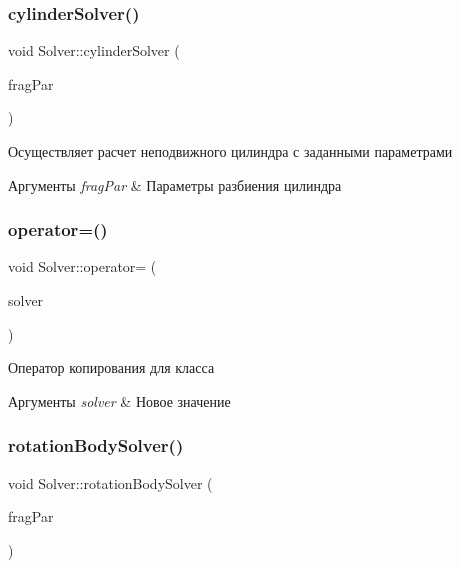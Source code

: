 \subsubsection{\texorpdfstring{cylinder\+Solver()}{cylinderSolver()}}
{\footnotesize\ttfamily void Solver\+::cylinder\+Solver (\begin{DoxyParamCaption}\item[{const \mbox{\hyperlink{struct_fragmentation_parameters}{Fragmentation\+Parameters}} \&}]{frag\+Par }\end{DoxyParamCaption})}

Осуществляет расчет неподвижного цилиндра с заданными параметрами 
\begin{DoxyParams}{Аргументы}
{\em frag\+Par} & Параметры разбиения цилиндра \\
\hline
\end{DoxyParams}
\mbox{\label{class_solver_afe651e3156a48c7c69a027b2604cf469}} 
\subsubsection{\texorpdfstring{operator=()}{operator=()}}
{\footnotesize\ttfamily void Solver\+::operator= (\begin{DoxyParamCaption}\item[{const \mbox{\hyperlink{class_solver}{Solver}} \&}]{solver }\end{DoxyParamCaption})}

Оператор копирования для класса 
\begin{DoxyParams}{Аргументы}
{\em solver} & Новое значение \\
\hline
\end{DoxyParams}
\mbox{\label{class_solver_ab33207a4b60cd437bcc2f58b04c147ca}} 
\subsubsection{\texorpdfstring{rotation\+Body\+Solver()}{rotationBodySolver()}}
{\footnotesize\ttfamily void Solver\+::rotation\+Body\+Solver (\begin{DoxyParamCaption}\item[{const \mbox{\hyperlink{struct_fragmentation_parameters}{Fragmentation\+Parameters}} \&}]{frag\+Par }\end{DoxyParamCaption})}

